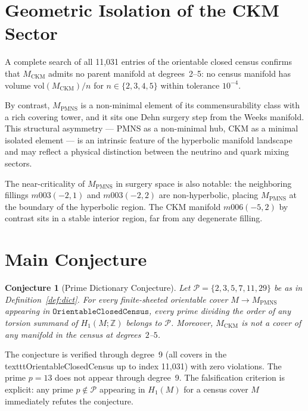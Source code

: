 \documentclass[12pt]{article}
\newtheorem{conjecture}[theorem]{Conjecture}
\theoremstyle{definition}
\begin{document}
\section{Geometric Isolation of the CKM Sector}
\label{sec:geometric}

A complete search of all 11{,}031 entries of the orientable closed census
confirms that $M_{\mathrm{CKM}}$ admits no parent manifold at degrees~2--5:
no census manifold has volume $\mathrm{vol}(M_{\mathrm{CKM}})/n$ for
$n \in \{2,3,4,5\}$ within tolerance $10^{-4}$.

By contrast, $M_{\mathrm{PMNS}}$ is a non-minimal element of its
commensurability class with a rich covering tower, and it sits one Dehn
surgery step from the Weeks manifold. This structural asymmetry --- PMNS
as a non-minimal hub, CKM as a minimal isolated element --- is an
intrinsic feature of the hyperbolic manifold landscape and may reflect a
physical distinction between the neutrino and quark mixing sectors.

The near-criticality of $M_{\mathrm{PMNS}}$ in surgery space is also
notable: the neighboring fillings $m003(-2,1)$ and $m003(-2,2)$ are
non-hyperbolic, placing $M_{\mathrm{PMNS}}$ at the boundary of the
hyperbolic region. The CKM manifold $m006(-5,2)$ by contrast sits in
a stable interior region, far from any degenerate filling.

\section{Main Conjecture}
\label{sec:conjecture}

\begin{conjecture}[Prime Dictionary Conjecture]
\label{conj:main}
Let $\mathcal{P} = \{2,3,5,7,11,29\}$ be as in
Definition~\ref{def:dict}. For every finite-sheeted orientable cover
$M \to M_{\mathrm{PMNS}}$ appearing in
$\texttt{OrientableClosedCensus}$, every prime dividing the order of
any torsion summand of $H_1(M;\mathbb{Z})$ belongs to $\mathcal{P}$.
Moreover, $M_{\mathrm{CKM}}$ is not a cover of any manifold in the
census at degrees~$2$--$5$.
\end{conjecture}

The conjecture is verified through degree~9 (all covers in the
\\texttt{OrientableClosedCensus} up to index 11{,}031) with zero violations.
The prime $p=13$ does not appear through degree~9. The falsification criterion is explicit: any prime
$p \notin \mathcal{P}$ appearing in $H_1(M)$ for a census cover $M$
immediately refutes the conjecture.
\end{document}
